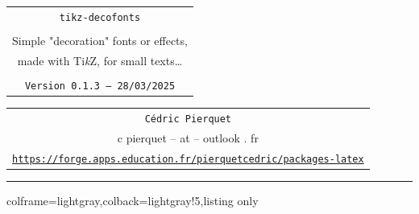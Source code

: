 \documentclass[11pt,a4paper]{ltxdoc}
\def\TPversion{0.1.3}
\def\TPdate{28/03/2025}
\begin{document}
\thispagestyle{empty}

\begin{center}
	\begin{minipage}{0.88\linewidth}
		\begin{tcolorbox}[colframe=yellow,colback=yellow!15]
			\begin{center}
				\renewcommand{\arraystretch}{1.25}%
				\begin{tabular}{c}
					{\Huge \texttt{tikz-decofonts}}\\
					\\
					{\LARGE Simple "decoration" fonts or effects,} \\
					{\LARGE made with Ti\textit{k}Z, for small texts\ldots} \\
					\\
					{\small \texttt{Version \TPversion{} -- \TPdate}}
				\end{tabular}
			\end{center}
		\end{tcolorbox}
	\end{minipage}
\end{center}

\begin{center}
	\begin{tabular}{c}
		\texttt{Cédric Pierquet}\\
		{\ttfamily c pierquet -- at -- outlook . fr}\\
		\texttt{\url{https://forge.apps.education.fr/pierquetcedric/packages-latex}} \\
	\end{tabular}
\end{center}

\hrule

\vfill

\begin{tcblisting}{colframe=lightgray,colback=lightgray!5,listing only}
\end{tcblisting}

\begin{tcolorbox}[colframe=lightgray,colback=lightgray!5]
\end{tcolorbox}
\end{document}

